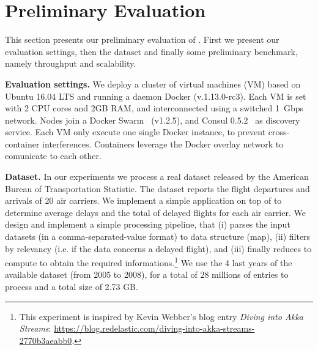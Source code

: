 \section{Preliminary Evaluation}
\label{sec:eval}

This section presents our preliminary evaluation of \SYS.
First we present our evaluation settings, then the dataset and finally some preliminary benchmark, namely throughput and scalability.

\textbf{Evaluation settings.} We deploy a cluster of virtual machines (VM) based on Ubuntu 16.04 LTS and running a daemon Docker (v.1.13.0-rc3).
Each VM is set with 2 CPU cores and 2GB RAM, and interconnected using a switched 1~Gbps network.
Nodes join a Docker Swarm~\cite{} (v1.2.5), and Consul 0.5.2~\cite{} as discovery service.
Each VM only execute one single Docker instance, to prevent cross-container interferences. 
Containers leverage the Docker overlay network to comunicate to each other.

\textbf{Dataset.} In our experiments we process a real dataset released by the American Bureau of Transportation Statistic\cite{rita:bts}.
The dataset reports the flight departures and arrivals of 20 air carriers\cite{statistical_computing:data}.%
We implement a simple application on top of \SYS to determine average delays and the total of delayed flights for each air carrier.
We design and implement a simple processing pipeline, that (i) parses the input datasets (in a comma-separated-value format) to data structure (map), (ii) filters by relevancy (i.e. if the data concerns a delayed flight), and (iii) finally reduces to compute to obtain the required informations.\footnote{This experiment is inspired by Kevin Webber's blog entry \emph{Diving into Akka Streams}: \url{https://blog.redelastic.com/diving-into-akka-streams-2770b3aeabb0}.}
We use the 4 last years of the available dataset (from 2005 to 2008), for a total of 28 millions of entries to process and a total size of 2.73 GB.

